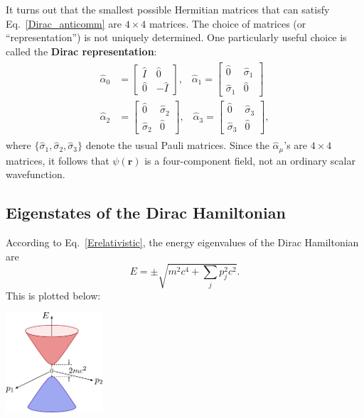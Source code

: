 \documentclass[pra,12pt]{revtex4}
\begin{document}
It turns out that the smallest possible Hermitian matrices that can
satisfy Eq.~\eqref{Dirac_anticomm} are $4\times4$ matrices.  The
choice of matrices (or ``representation'') is not uniquely determined.
One particularly useful choice is called the \textbf{Dirac
  representation}:
\begin{align}
  \begin{aligned}
    \hat{\alpha}_0 &= \begin{bmatrix}
      \hat{I}\, & \hat{0} \\ \hat{0} & -\hat{I}
    \end{bmatrix}, \;\;\;
    \hat{\alpha}_1 = \begin{bmatrix}
      \hat{0} & \hat{\sigma}_1 \\ \hat{\sigma}_1 & \hat{0}
    \end{bmatrix} \\
    \hat{\alpha}_2 &= \begin{bmatrix}
      \hat{0} & \hat{\sigma}_2 \\ \hat{\sigma}_2 & \hat{0}
    \end{bmatrix}, \;\;\;
    \hat{\alpha}_3 = \begin{bmatrix}
      \hat{0} & \hat{\sigma}_3 \\ \hat{\sigma}_3 & \hat{0}
    \end{bmatrix},
  \end{aligned}
  \label{alpha_matrices}
\end{align}
where $\{\hat{\sigma}_{1}, \hat{\sigma}_{2}, \hat{\sigma}_{3}\}$
denote the usual Pauli matrices.  Since the $\hat{\alpha}_\mu$'s are
$4\times4$ matrices, it follows that $\psi(\mathbf{r})$ is a
four-component field, not an ordinary scalar wavefunction.

\subsection{Eigenstates of the Dirac Hamiltonian}
\label{sec:deigenstates}

According to Eq.~\eqref{Erelativistic}, the energy eigenvalues of the
Dirac Hamiltonian are
\begin{equation}
  E = \pm \sqrt{m^2c^4 + \sum_{j} p_j^2c^2}.
\end{equation}
This is plotted below:

\begin{center}
  \includegraphics[width=0.27\textwidth]{diraccone}
\end{center}
\end{document}

